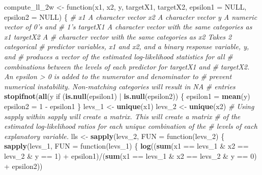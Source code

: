 \documentclass[10pt]{report}
\newenvironment{Shaded}{}{}
\newcommand{\KeywordTok}[1]{\textcolor[rgb]{0.00,0.44,0.13}{\textbf{{#1}}}}
\newcommand{\DataTypeTok}[1]{\textcolor[rgb]{0.56,0.13,0.00}{{#1}}}
\newcommand{\DecValTok}[1]{\textcolor[rgb]{0.25,0.63,0.44}{{#1}}}
\newcommand{\StringTok}[1]{\textcolor[rgb]{0.25,0.44,0.63}{{#1}}}
\newcommand{\CommentTok}[1]{\textcolor[rgb]{0.38,0.63,0.69}{\textit{{#1}}}}
\newcommand{\OtherTok}[1]{\textcolor[rgb]{0.00,0.44,0.13}{{#1}}}
\newcommand{\NormalTok}[1]{{#1}}
\begin{document}
\begin{Shaded}
\begin{Highlighting}[]
{\NormalTok{compute_ll_2w <-}\StringTok{ }\NormalTok{function(x1, x2, y, targetX1, targetX2, }\DataTypeTok{epsilon1 =} \OtherTok{NULL}\NormalTok{, }\DataTypeTok{epsilon2 =} \OtherTok{NULL}\NormalTok{) \{}
    \CommentTok{# x1 A character vector x2 A character vector y A numeric vector of 0's and}
    \CommentTok{# 1's targetX1 A character vector with the same categories as x1 targetX2 A}
    \CommentTok{# character vector with the same categories as x2 Takes 2 categorical}
    \CommentTok{# predictor variables, x1 and x2, and a binary response variable, y, and}
    \CommentTok{# produces a vector of the estimated log-likelihood statistics for all}
    \CommentTok{# combinations between the levels of each predictor for targetX1 and}
    \CommentTok{# targetX2.  An epsilon > 0 is added to the numerator and denominator to}
    \CommentTok{# prevent numerical instability.  Non-matching categories will result in NA}
    \CommentTok{# entries}
    \KeywordTok{stopifnot}\NormalTok{(}\KeywordTok{all}\NormalTok{(y %in%}\StringTok{ }\KeywordTok{c}\NormalTok{(}\DecValTok{0}\NormalTok{, }\DecValTok{1}\NormalTok{)))  }\CommentTok{# response has to be binary}
    \NormalTok{if (}\KeywordTok{is.null}\NormalTok{(epsilon1) |}\StringTok{ }\KeywordTok{is.null}\NormalTok{(epsilon2)) \{}
        \NormalTok{epsilon1 =}\StringTok{ }\KeywordTok{mean}\NormalTok{(y)}
        \NormalTok{epsilon2 =}\StringTok{ }\DecValTok{1} \NormalTok{-}\StringTok{ }\NormalTok{epsilon1}
    \NormalTok{\}}
    \NormalTok{levs_1 <-}\StringTok{ }\KeywordTok{unique}\NormalTok{(x1)}
    \NormalTok{levs_2 <-}\StringTok{ }\KeywordTok{unique}\NormalTok{(x2)}
    \CommentTok{# Using sapply within sapply will create a matrix. This will create a matrix}
    \CommentTok{# of the estimated log-likelihood ratios for each unique combination of the}
    \CommentTok{# levels of each explanatory variable.}
    \NormalTok{lls <-}\StringTok{ }\KeywordTok{sapply}\NormalTok{(levs_2, }\DataTypeTok{FUN =} \NormalTok{function(levs_2) \{}
        \KeywordTok{sapply}\NormalTok{(levs_1, }\DataTypeTok{FUN =} \NormalTok{function(levs_1) \{}
            \KeywordTok{log}\NormalTok{((}\KeywordTok{sum}\NormalTok{(x1 ==}\StringTok{ }\NormalTok{levs_1 &}\StringTok{ }\NormalTok{x2 ==}\StringTok{ }\NormalTok{levs_2 &}\StringTok{ }\NormalTok{y ==}\StringTok{ }\DecValTok{1}\NormalTok{) +}\StringTok{ }\NormalTok{epsilon1)/(}\KeywordTok{sum}\NormalTok{(x1 ==}\StringTok{ }
\StringTok{                }\NormalTok{levs_1 &}\StringTok{ }\NormalTok{x2 ==}\StringTok{ }\NormalTok{levs_2 &}\StringTok{ }\NormalTok{y ==}\StringTok{ }\DecValTok{0}\NormalTok{) +}\StringTok{ }\NormalTok{epsilon2))}
}}
\end{Highlighting}
\end{Shaded}
\end{document}
